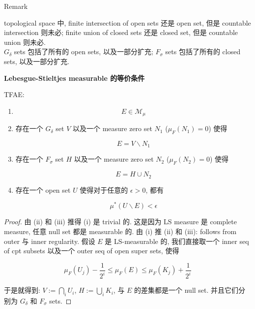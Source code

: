 \documentclass{qlnotes-export}
\begin{document}
\begin{qlremark}{Remark}

topological space 中, finite intersection of open sets 还是 open set, 但是 countable intersection 则未必; finite union of closed sets 还是 closed set, 但是 countable union 则未必.\\
\(G_{\delta}\) sets 包括了所有的 open sets, 以及一部分扩充; \(F_{\sigma}\) sets 包括了所有的 closed sets, 以及一部分扩充.

\end{qlremark}

\begin{theorem}{\protect{}\label{kn-lebesgue-stieltjes-measurable}{\textbf{Lebesgue-Stieltjes
measurable 的等价条件}}}\label{thm-03-distribution-function-lebesgue-stieltjes-measures-lebesgue-stieltjes-measurable}

TFAE:

\begin{enumerate}
\item
  \[E \in \mathcal{M}_{\mu}\]
\item
  存在一个 \(G_{\delta}\) set \(V\) 以及一个 measure zero set \(N_{1}\) (\(\mu_{F}(N_{1}) = 0\)) 使得

  \[E = V\backslash N_{1}\]
\item
  存在一个 \(F_{\sigma}\) set \(H\) 以及一个 measure zero set \(N_{2}\) (\(\mu_{F}(N_{2}) = 0\)) 使得

  \[E = H \cup N_{2}\]
\item
  存在一个 open set \(U\) 使得对于任意的 \(\epsilon > 0\), 都有

  \[\mu^{\ast}(U\backslash E) < \epsilon\]
\end{enumerate}

\end{theorem}

\begin{proof}

由 (ii) 和 (iii) 推得 (i) 是 trivial 的. 这是因为 LS measure 是 complete measure, 任意 null set 都是 measurable 的. 由 (i) 推 (ii) 和 (iii): follows from outer 与 inner regularity. 假设 \(E\) 是 LS-measurable 的, 我们直接取一个 inner seq of cpt subsets 以及一个 outer seq of open super sets, 使得

\[\mu_{F}(U_{j}) - \frac{1}{2^{i}} \leq \mu_{F}(E) \leq \mu_{F}(K_{j}) + \frac{1}{2^{i}}\]

于是就得到: \(V := \bigcap_{i}U_{i}\), \(H := \bigcup_{i}K_{i}\), 与 \(E\) 的差集都是一个 null set. 并且它们分别为 \(G_{\delta}\) 和 \(F_{\sigma}\) sets.

\end{proof}
\end{document}
